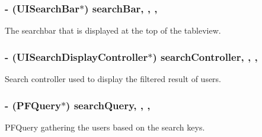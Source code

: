 \subsubsection[{search\+Bar}]{\setlength{\rightskip}{0pt plus 5cm}-\/ (U\+I\+Search\+Bar$\ast$) search\+Bar\hspace{0.3cm}{\ttfamily [read]}, {\ttfamily [write]}, {\ttfamily [nonatomic]}, {\ttfamily [strong]}}\label{interface_e_s_find_friends_view_controller_ac0da7a98d3c42f522f0a07a427b809b2}
The searchbar that is displayed at the top of the tableview. \hypertarget{interface_e_s_find_friends_view_controller_afec3de77bea307e1ed8552c89b93c9ae}{}
\subsubsection[{search\+Controller}]{\setlength{\rightskip}{0pt plus 5cm}-\/ (U\+I\+Search\+Display\+Controller$\ast$) search\+Controller\hspace{0.3cm}{\ttfamily [read]}, {\ttfamily [write]}, {\ttfamily [nonatomic]}, {\ttfamily [strong]}}\label{interface_e_s_find_friends_view_controller_afec3de77bea307e1ed8552c89b93c9ae}
Search controller used to display the filtered result of users. \hypertarget{interface_e_s_find_friends_view_controller_afe05f16e5341cefd3ccc7af7589e25c4}{}
\subsubsection[{search\+Query}]{\setlength{\rightskip}{0pt plus 5cm}-\/ (P\+F\+Query$\ast$) search\+Query\hspace{0.3cm}{\ttfamily [read]}, {\ttfamily [write]}, {\ttfamily [nonatomic]}, {\ttfamily [strong]}}\label{interface_e_s_find_friends_view_controller_afe05f16e5341cefd3ccc7af7589e25c4}
P\+F\+Query gathering the users based on the search keys. \hypertarget{interface_e_s_find_friends_view_controller_aba3bb2973883c6a6b78e8bdcfb1f7ed7}{}
